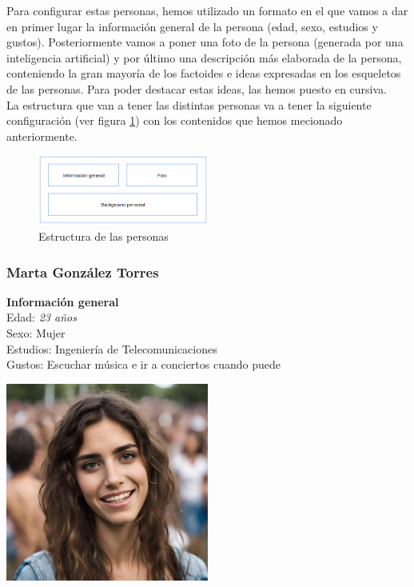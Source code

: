 Para configurar estas personas, hemos utilizado un formato en el que vamos a dar en primer lugar la información general de la persona (edad, sexo, estudios y gustos). Posteriormente vamos a poner una foto de la persona (generada por una inteligencia artificial) y por último una descripción más elaborada de la persona, conteniendo la gran mayoría de los factoides e ideas expresadas en los esqueletos de las personas. Para poder destacar estas ideas, las hemos puesto en cursiva. \\

La estructura que van a tener las distintas personas va a tener la siguiente configuración (ver figura \ref{fig:estructura-personas}) con los contenidos que hemos mecionado anteriormente.
\begin{figure}[h]
    \centering
    \includegraphics[width=0.5\textwidth]{Imagenes/Personas/Plantilla personas.png}
    \caption{Estructura de las personas}
    \label{fig:estructura-personas}
\end{figure}

\subsubsection{Marta González Torres}

\begin{minipage}{0.4\textwidth}
    \textbf{Información general} \\

    Edad: \textit{23 años} \\
    Sexo: Mujer \\
    Estudios: Ingeniería de Telecomunicaciones \\
    Gustos: Escuchar música e ir a conciertos cuando puede \\
\end{minipage}
\hfill
\begin{minipage}{0.4\textwidth}
    \includegraphics[width=0.5\textwidth]{Imagenes/Personas/Marta.jpg}
\end{minipage}

